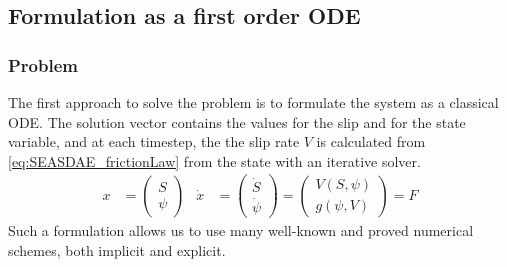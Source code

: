 \subsection{Formulation as a first order ODE}
\subsubsection{Problem}
The first approach to solve the problem is to formulate the system as a classical ODE. The solution vector contains the values for the slip and for the state variable, and at each timestep, the the slip rate $V$ is calculated from \autoref{eq:SEASDAE_frictionLaw} from the state with an iterative solver.
\begin{align}
	\label{eq:ODE_formulation_SEAS}
	x &= \begin{pmatrix}
		S \\ \psi
	\end{pmatrix} & \dot{x} &= \begin{pmatrix}
								  \dot{S} \\ \dot{\psi}
							   \end{pmatrix} = \begin{pmatrix}
												   V(S,\psi) \\ g(\psi, V)
											   \end{pmatrix} = F
\end{align} 
Such a formulation allows us to use many well-known and proved numerical schemes, both implicit and explicit. 

